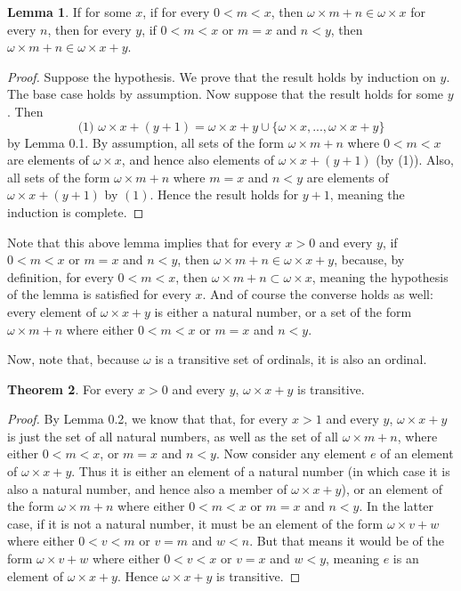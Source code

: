 \documentclass{article}
\theoremstyle{definition}
\newtheorem{theorem}{Theorem}[section]
\newtheorem{lemma}[theorem]{Lemma}
\begin{document}
\begin{lemma} If for some $x$, if for every $0<m<x$, then $\omega\times m+n\in\omega\times x$ for every $n$,
then for every $y$, if $0<m<x$ or $m=x$ and $n<y$, then $\omega\times m+n\in\omega\times x+y$.
\end{lemma}
\begin{proof}
Suppose the hypothesis. We prove that the result holds by induction on $y$. The base case holds
by assumption. Now suppose that the result holds for some $y$. Then
\[ \textrm{(1) }\omega\times x+(y+1)=\omega\times x+y\cup\{\omega\times x,...,\omega\times x+y\} \] by 
Lemma 0.1. By assumption, all sets of the form $\omega\times m+n$ where $0<m<x$ are elements of
$\omega\times x$, and hence also elements of $\omega\times x+(y+1)$ (by (1)). Also, all sets of the form
$\omega\times m+n$ where $m=x$ and $n<y$ are elements of $\omega\times x+(y+1)$ by $(1)$. Hence the result holds
for $y+1$, meaning the induction is complete.
\end{proof}

Note that this above lemma implies that for every $x>0$ and every $y$, if $0<m<x$ or $m=x$ and $n<y$, then
$\omega\times m+n\in\omega\times x+y$, because, by definition, for every $0<m<x$, then
$\omega\times m+n\subset\omega\times x$, meaning the hypothesis of the lemma is satisfied for every $x$. And of course the converse holds
as well: every element of $\omega\times x+y$ is either a natural number, or a set of the form
$\omega\times m+n$ where either $0<m<x$ or $m=x$ and $n<y$.

Now, note that, because $\omega$ is a transitive set of ordinals, it is also an ordinal.
\begin{theorem} For every $x>0$ and every $y$, $\omega\times x+y$ is transitive.
\end{theorem}
\begin{proof}
By Lemma 0.2, we know that that, for every $x>1$ and every $y$, $\omega\times x+y$ is just the set of all natural numbers, 
as well as the set of all $\omega\times m+n$, where either $0<m<x$, or $m=x$ and $n<y$. Now consider any element $e$ of an element of 
$\omega\times x+y$. Thus it is either an element of a natural number (in which case it is also a natural number, and hence also 
a member of $\omega\times x+y$), or an element of the form $\omega\times m+n$ where either $0<m<x$ or $m=x$ and $n<y$. In the latter case, 
if it is not a natural number, it must be an element of the form $\omega\times v+w$ where either $0<v<m$ or $v=m$ and $w<n$. But that means 
it would be of the form $\omega\times v+w$ where either $0<v<x$ or $v=x$ and $w<y$, meaning $e$ is an element of $\omega\times x+y$. Hence 
$\omega\times x+y$ is transitive.
\end{proof}
\end{document}

